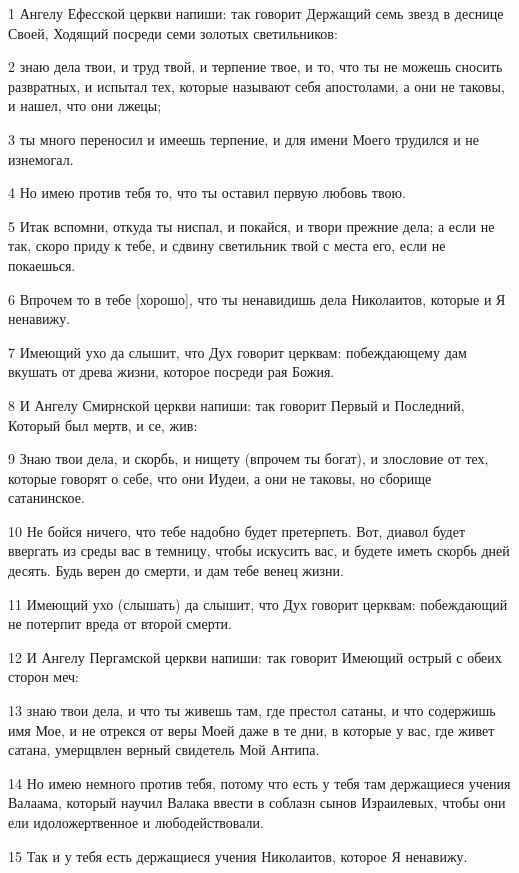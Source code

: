 \par 1 Ангелу Ефесской церкви напиши: так говорит Держащий семь звезд в деснице Своей, Ходящий посреди семи золотых светильников:
\par 2 знаю дела твои, и труд твой, и терпение твое, и то, что ты не можешь сносить развратных, и испытал тех, которые называют себя апостолами, а они не таковы, и нашел, что они лжецы;
\par 3 ты много переносил и имеешь терпение, и для имени Моего трудился и не изнемогал.
\par 4 Но имею против тебя то, что ты оставил первую любовь твою.
\par 5 Итак вспомни, откуда ты ниспал, и покайся, и твори прежние дела; а если не так, скоро приду к тебе, и сдвину светильник твой с места его, если не покаешься.
\par 6 Впрочем то в тебе [хорошо], что ты ненавидишь дела Николаитов, которые и Я ненавижу.
\par 7 Имеющий ухо да слышит, что Дух говорит церквам: побеждающему дам вкушать от древа жизни, которое посреди рая Божия.
\par 8 И Ангелу Смирнской церкви напиши: так говорит Первый и Последний, Который был мертв, и се, жив:
\par 9 Знаю твои дела, и скорбь, и нищету (впрочем ты богат), и злословие от тех, которые говорят о себе, что они Иудеи, а они не таковы, но сборище сатанинское.
\par 10 Не бойся ничего, что тебе надобно будет претерпеть. Вот, диавол будет ввергать из среды вас в темницу, чтобы искусить вас, и будете иметь скорбь дней десять. Будь верен до смерти, и дам тебе венец жизни.
\par 11 Имеющий ухо (слышать) да слышит, что Дух говорит церквам: побеждающий не потерпит вреда от второй смерти.
\par 12 И Ангелу Пергамской церкви напиши: так говорит Имеющий острый с обеих сторон меч:
\par 13 знаю твои дела, и что ты живешь там, где престол сатаны, и что содержишь имя Мое, и не отрекся от веры Моей даже в те дни, в которые у вас, где живет сатана, умерщвлен верный свидетель Мой Антипа.
\par 14 Но имею немного против тебя, потому что есть у тебя там держащиеся учения Валаама, который научил Валака ввести в соблазн сынов Израилевых, чтобы они ели идоложертвенное и любодействовали.
\par 15 Так и у тебя есть держащиеся учения Николаитов, которое Я ненавижу.
